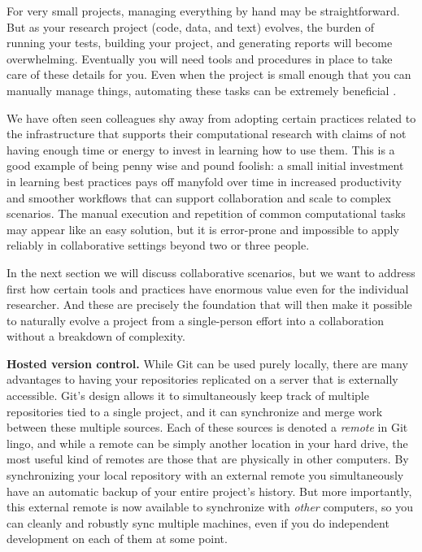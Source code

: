 \documentclass[ChapterTOCs,krantz2]{krantz} %
\newcommand{\blockpar}[1]{\vspace*{3mm} \noindent \textbf{#1}}
\begin{document}
For very small projects, managing everything by hand may be straightforward.
But as your research project (code, data, and text) evolves, the burden of
running your tests, building your project, and generating reports will become
overwhelming. Eventually you will need tools and procedures in place to take
care of these details for you. Even when the project is small enough that you
can manually manage things, automating these tasks can be extremely beneficial
\cite{doar2005practical}.

We have often seen colleagues shy away from adopting certain practices related
to the infrastructure that supports their computational research with claims of
not having enough time or energy to invest in learning how to use them.  This
is a good example of being penny wise and pound foolish: a small initial
investment in learning best practices pays off manyfold over time in increased
productivity and smoother workflows that can support collaboration and scale to
complex scenarios.  The manual execution and repetition of common computational
tasks may appear like an easy solution, but it is error-prone and impossible to
apply reliably in collaborative settings beyond two or three people.

In the next section we will discuss collaborative scenarios, but we want to
address first how certain tools and practices have enormous value even for the
individual researcher.  And these are precisely the foundation that will then
make it possible to naturally evolve a project from a single-person effort into
a collaboration without a breakdown of complexity.

\blockpar{Hosted version control.}  While Git can be used purely locally, there
are many advantages to having your repositories replicated on a server that is
externally accessible.  Git's design allows it to simultaneously keep track of
multiple repositories tied to a single project, and it can synchronize and
merge work between these multiple sources.  Each of these sources is denoted a
\emph{remote} in Git lingo, and while a remote can be simply another location
in your hard drive, the most useful kind of remotes are those that are
physically in other computers.  By synchronizing your local repository with an
external remote you simultaneously have an automatic backup of your entire
project's history.  But more importantly, this external remote is now available
to synchronize with \emph{other} computers, so you can cleanly and robustly
sync multiple machines, even if you do independent development on each of them
at some point.
\end{document}
